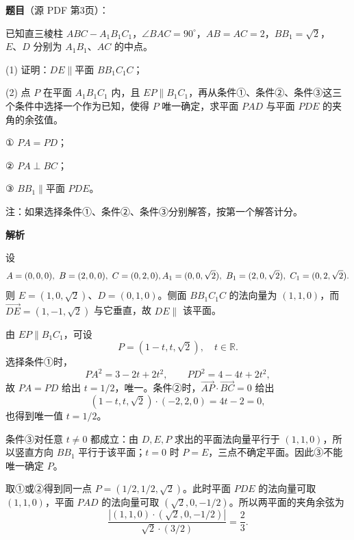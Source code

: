 \begin{answer}

\textbf{题目}（源 PDF 第3页）：

已知直三棱柱 \(ABC-A_1B_1C_1\)，\(\angle BAC=90^\circ\)，\(AB=AC=2\)，\(BB_1=\sqrt{2}\)，\(E、D\) 分别为 \(A_1B_1、AC\) 的中点。
\nopagebreak[4]
\begin{center}\end{center}
\nopagebreak[4]
(1) 证明：\(DE\parallel\)平面 \(BB_1C_1C\)；

(2) 点 \(P\) 在平面 \(A_1B_1C_1\) 内，且 \(EP\parallel B_1C_1\)，再从条件①、条件②、条件③这三个条件中选择一个作为已知，使得 \(P\) 唯一确定，求平面 \(PAD\) 与平面 \(PDE\) 的夹角的余弦值。

① \(PA=PD\)；

② \(PA\perp BC\)；

③ \(BB_1\parallel\)平面 \(PDE\)。

注：如果选择条件①、条件②、条件③分别解答，按第一个解答计分。

\textbf{解析}


设
\nopagebreak[4]
\[
A=(0,0,0),\ B=(2,0,0),\ C=(0,2,0),\\
A_1=(0,0,\sqrt2),\ B_1=(2,0,\sqrt2),\ C_1=(0,2,\sqrt2).
\]
则 \(E=(1,0,\sqrt2)\)、\(D=(0,1,0)\)。侧面 \(BB_1C_1C\) 的法向量为 \((1,1,0)\)，而 \(\overrightarrow{DE}=(1,-1,\sqrt2)\) 与它垂直，故 \(DE\parallel\) 该平面。


由 \(EP\parallel B_1C_1\)，可设
\nopagebreak[4]
\[
P=(1-t,t,\sqrt2),\quad t\in\mathbb R.
\]
选择条件①时，
\nopagebreak[4]
\[
PA^2=3-2t+2t^2,\qquad PD^2=4-4t+2t^2,
\]
故 \(PA=PD\) 给出 \(t=1/2\)，唯一。条件②时，\(\overrightarrow{AP}\cdot\overrightarrow{BC}=0\) 给出
\nopagebreak[4]
\[
(1-t,t,\sqrt2)\cdot(-2,2,0)=4t-2=0,
\]
也得到唯一值 \(t=1/2\)。

条件③对任意 \(t\ne0\) 都成立：由 \(D,E,P\) 求出的平面法向量平行于 \((1,1,0)\)，所以竖直方向 \(BB_1\) 平行于该平面；\(t=0\) 时 \(P=E\)，三点不确定平面。因此③不能唯一确定 \(P\)。

取①或②得到同一点 \(P=(1/2,1/2,\sqrt2)\)。此时平面 \(PDE\) 的法向量可取 \((1,1,0)\)，平面 \(PAD\) 的法向量可取 \((\sqrt2,0,-1/2)\)。所以两平面的夹角余弦为
\nopagebreak[4]
\[
\frac{|(1,1,0)\cdot(\sqrt2,0,-1/2)|}{\sqrt2\cdot(3/2)}=\frac23.
\]



\end{answer}
